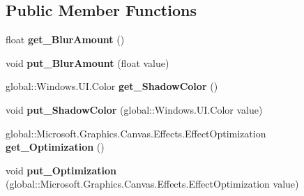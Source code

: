 \subsection*{Public Member Functions}
\begin{DoxyCompactItemize}
\item 
\mbox{\label{interface_microsoft_1_1_graphics_1_1_canvas_1_1_effects_1_1_i_shadow_effect_a49b43e4fdcdcf0af12d8a5e4005a11e8}} 
float {\bfseries get\+\_\+\+Blur\+Amount} ()
\item 
\mbox{\label{interface_microsoft_1_1_graphics_1_1_canvas_1_1_effects_1_1_i_shadow_effect_a9d0a51d4856757395eab29060b840a88}} 
void {\bfseries put\+\_\+\+Blur\+Amount} (float value)
\item 
\mbox{\label{interface_microsoft_1_1_graphics_1_1_canvas_1_1_effects_1_1_i_shadow_effect_adcb13593e07a265b7d02f8cc8a31445a}} 
global\+::\+Windows.\+U\+I.\+Color {\bfseries get\+\_\+\+Shadow\+Color} ()
\item 
\mbox{\label{interface_microsoft_1_1_graphics_1_1_canvas_1_1_effects_1_1_i_shadow_effect_aa05abfa69f066a62740ff1025d57fd9c}} 
void {\bfseries put\+\_\+\+Shadow\+Color} (global\+::\+Windows.\+U\+I.\+Color value)
\item 
\mbox{\label{interface_microsoft_1_1_graphics_1_1_canvas_1_1_effects_1_1_i_shadow_effect_a3d8042cc4e97fb3285cfbbb0f3c8a52f}} 
global\+::\+Microsoft.\+Graphics.\+Canvas.\+Effects.\+Effect\+Optimization {\bfseries get\+\_\+\+Optimization} ()
\item 
\mbox{\label{interface_microsoft_1_1_graphics_1_1_canvas_1_1_effects_1_1_i_shadow_effect_a47609594c0d8db1c5d91cfbd3413feba}} 
void {\bfseries put\+\_\+\+Optimization} (global\+::\+Microsoft.\+Graphics.\+Canvas.\+Effects.\+Effect\+Optimization value)
\item 
\mbox{\label{interface_microsoft_1_1_graphics_1_1_canvas_1_1_effects_1_1_i_shadow_effect_aac90c7161656038d0dfc1177b36c6c66}} 

\end{DoxyCompactItemize}
